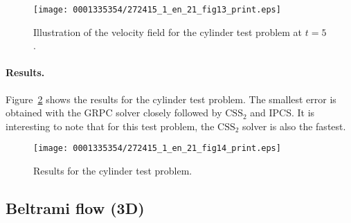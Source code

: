 \begin{figure}[!t]
  \centering
 \texttt{[image: 0001335354/272415\_1\_en\_21\_fig13\_print.eps]}
    \caption{Illustration of the velocity field for the
      cylinder test problem at $t = 5$.}
    \label{fig:cylinder_illustration}%
\end{figure}

\paragraph{Results.}

Figure~\ref{fig:cylinder_res} shows the results for the cylinder test
problem. The smallest error is obtained with the GRPC solver closely
followed by $\mathrm{CSS}_2$ and IPCS. It is interesting to note that
for this test problem, the $\mathrm{CSS}_2$ solver is also the
fastest.

\begin{figure}[!t]
\centering
\texttt{[image: 0001335354/272415\_1\_en\_21\_fig14\_print.eps]}
\caption{Results for the cylinder test problem.}
\label{fig:cylinder_res}
\end{figure}

\subsection{Beltrami flow (3D)}

